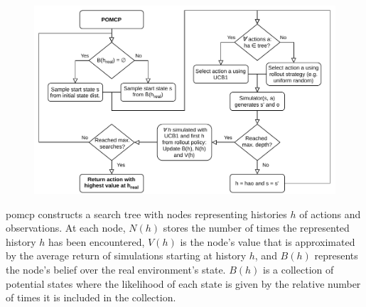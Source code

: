 \begin{figure}[htbp]
    \centerfloat
    \includegraphics[width=1.2\textwidth]{figures/POMCP.pdf}
\end{figure}

\Gls{pomcp} constructs a search tree with nodes representing histories $h$ of actions and observations. At each node, $N(h)$ stores the number of times the represented history $h$ has been encountered, $V(h)$ is the node's value that is approximated by the average return of simulations starting at history $h$, and $B(h)$ represents the node's belief over the real environment's state. $B(h)$ is a collection of potential states where the likelihood of each state is given by the relative number of times it is included in the collection.

